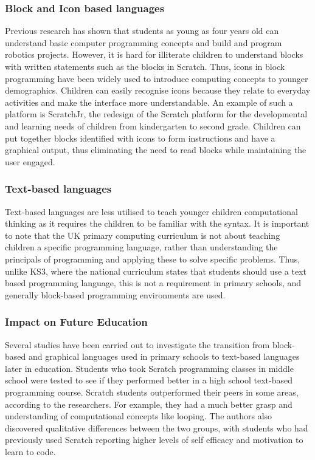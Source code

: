 \documentclass[oneside,%
                    author={Malak Hajji},
                    degree={BSc},
                    title={Designing An Accessible Computational Toolkit For Students},
                  subtitle={With Mixed Visual Abilities}]{dissertation}
\begin{document}
\subsubsection{Block and Icon based languages}
Previous research has shown that students as young as four years old can understand basic computer programming concepts and build and program robotics projects\cite{bers}. However, it is hard for illiterate children to understand blocks with written statements such as the blocks in Scratch. Thus, icons in block programming have been widely used to introduce computing concepts to younger demographics. Children can easily recognise icons because they relate to everyday activities and make the interface more understandable. 
An example of such a platform is ScratchJr\cite{scratchjr}, the redesign of the Scratch platform for the developmental and learning needs of children from kindergarten to second grade. Children can put together blocks identified with icons to form instructions and have a graphical output, thus eliminating the need to read blocks while maintaining the user engaged.

\subsubsection{Text-based languages}

Text-based languages are less utilised to teach younger children computational thinking as it requires the children to be familiar with the syntax. It is important to note that the UK primary computing curriculum is not about teaching children a specific programming language, rather than understanding the principals of programming and applying these to solve specific problems.\cite{curricula} Thus, unlike KS3, where the national curriculum states that students should use a text based programming language, this is not a requirement in primary schools, and generally block-based programming environments are used.

\subsubsection{Impact on Future Education }
Several studies have been carried out to investigate the transition from block-based and graphical languages used in primary schools to text-based languages later in education. Students who took Scratch programming classes in middle school were tested to see if they performed better in a high school text-based programming course\cite{phd}. Scratch students outperformed their peers in some areas, according to the researchers. For example, they had a much better grasp and understanding of computational concepts like looping. The authors also discovered qualitative differences between the two groups, with students who had previously used Scratch reporting higher levels of self efficacy and motivation to learn to code.
\end{document}
